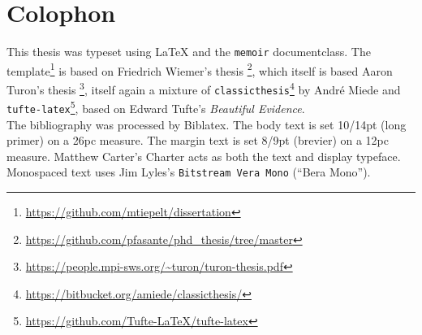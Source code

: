
\pagestyle{empty}

\hfill

\vfill


\section*{Colophon}

This thesis was typeset using \LaTeX{} and the \texttt{memoir} documentclass. 
The template\footnote{\url{https://github.com/mtiepelt/dissertation}} is based on Friedrich Wiemer's thesis \footnote{\url{https://github.com/pfasante/phd_thesis/tree/master}}, 
which itself is based Aaron Turon's thesis \footnote{\url{https://people.mpi-sws.org/~turon/turon-thesis.pdf}}, itself again a mixture of \texttt{classicthesis}\footnote{\url{https://bitbucket.org/amiede/classicthesis/}} by Andr\'e Miede and \texttt{tufte-latex}\footnote{\url{https://github.com/Tufte-LaTeX/tufte-latex}}, based on Edward Tufte's \emph{Beautiful Evidence}.\\[0.5\baselineskip]
%
The bibliography was processed by Biblatex.
%
The body text is set 10/14pt (long primer) on a 26pc measure.
The margin text is set 8/9pt (brevier) on a 12pc measure.
Matthew Carter's \textrm{Charter} acts as both the text and display typeface.
Monospaced text uses Jim Lyles's \texttt{Bitstream Vera Mono} (\enquote{Bera Mono}).\\[0.5\baselineskip]
%


